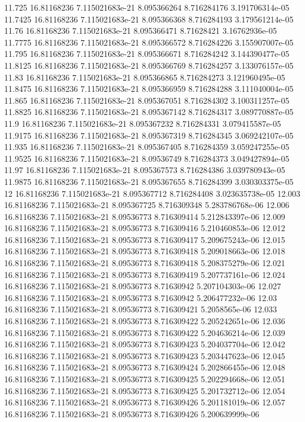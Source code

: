 {11.725 16.81168236 7.115021683e-21 8.095366264 8.716284176 3.191706314e-05
11.7425 16.81168236 7.115021683e-21 8.095366368 8.716284193 3.179561214e-05
11.76 16.81168236 7.115021683e-21 8.095366471 8.71628421 3.16762936e-05
11.7775 16.81168236 7.115021683e-21 8.095366572 8.716284226 3.155907007e-05
11.795 16.81168236 7.115021683e-21 8.095366671 8.716284242 3.144390477e-05
11.8125 16.81168236 7.115021683e-21 8.095366769 8.716284257 3.133076157e-05
11.83 16.81168236 7.115021683e-21 8.095366865 8.716284273 3.121960495e-05
11.8475 16.81168236 7.115021683e-21 8.095366959 8.716284288 3.111040004e-05
11.865 16.81168236 7.115021683e-21 8.095367051 8.716284302 3.100311257e-05
11.8825 16.81168236 7.115021683e-21 8.095367142 8.716284317 3.089770887e-05
11.9 16.81168236 7.115021683e-21 8.095367232 8.716284331 3.079415587e-05
11.9175 16.81168236 7.115021683e-21 8.095367319 8.716284345 3.069242107e-05
11.935 16.81168236 7.115021683e-21 8.095367405 8.716284359 3.059247255e-05
11.9525 16.81168236 7.115021683e-21 8.09536749 8.716284373 3.049427894e-05
11.97 16.81168236 7.115021683e-21 8.095367573 8.716284386 3.039780943e-05
11.9875 16.81168236 7.115021683e-21 8.095367655 8.716284399 3.030303375e-05
12 16.81168236 7.115021683e-21 8.095367712 8.716284408 3.023635738e-05
12.003 16.81168236 7.115021683e-21 8.095367725 8.716309348 5.283786768e-06
12.006 16.81168236 7.115021683e-21 8.09536773 8.716309414 5.212843397e-06
12.009 16.81168236 7.115021683e-21 8.09536773 8.716309416 5.210460853e-06
12.012 16.81168236 7.115021683e-21 8.09536773 8.716309417 5.209675243e-06
12.015 16.81168236 7.115021683e-21 8.09536773 8.716309418 5.209018663e-06
12.018 16.81168236 7.115021683e-21 8.09536773 8.716309418 5.208375279e-06
12.021 16.81168236 7.115021683e-21 8.09536773 8.716309419 5.207737161e-06
12.024 16.81168236 7.115021683e-21 8.09536773 8.71630942 5.207104303e-06
12.027 16.81168236 7.115021683e-21 8.09536773 8.71630942 5.206477232e-06
12.03 16.81168236 7.115021683e-21 8.09536773 8.716309421 5.2058565e-06
12.033 16.81168236 7.115021683e-21 8.09536773 8.716309422 5.205242651e-06
12.036 16.81168236 7.115021683e-21 8.09536773 8.716309422 5.204636214e-06
12.039 16.81168236 7.115021683e-21 8.09536773 8.716309423 5.204037704e-06
12.042 16.81168236 7.115021683e-21 8.09536773 8.716309423 5.203447623e-06
12.045 16.81168236 7.115021683e-21 8.09536773 8.716309424 5.202866455e-06
12.048 16.81168236 7.115021683e-21 8.09536773 8.716309425 5.202294668e-06
12.051 16.81168236 7.115021683e-21 8.09536773 8.716309425 5.201732712e-06
12.054 16.81168236 7.115021683e-21 8.09536773 8.716309426 5.201181019e-06
12.057 16.81168236 7.115021683e-21 8.09536773 8.716309426 5.200639999e-06
}
